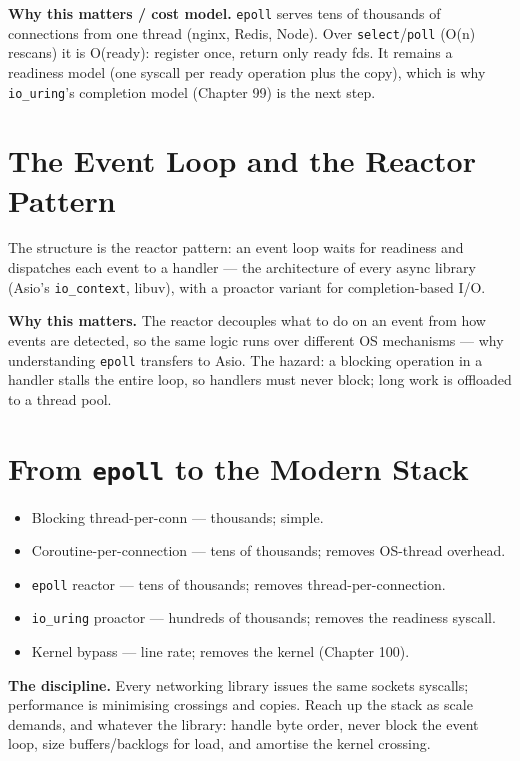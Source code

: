 \textbf{Why this matters / cost model.} \texttt{epoll} serves tens of thousands of connections from one thread (nginx, Redis, Node). Over \texttt{select}/\texttt{poll} (O(n) rescans) it is O(ready): register once, return only ready fds. It remains a readiness model (one syscall per ready operation plus the copy), which is why \texttt{io\_uring}'s completion model (Chapter 99) is the next step.

\section{The Event Loop and the Reactor Pattern}
The structure is the reactor pattern: an event loop waits for readiness and dispatches each event to a handler --- the architecture of every async library (Asio's \texttt{io\_context}, libuv), with a proactor variant for completion-based I/O.

\textbf{Why this matters.} The reactor decouples what to do on an event from how events are detected, so the same logic runs over different OS mechanisms --- why understanding \texttt{epoll} transfers to Asio. The hazard: a blocking operation in a handler stalls the entire loop, so handlers must never block; long work is offloaded to a thread pool.

\section{From \texttt{epoll} to the Modern Stack}
\begin{itemize}
\item Blocking thread-per-conn --- thousands; simple.
\item Coroutine-per-connection --- tens of thousands; removes OS-thread overhead.
\item \texttt{epoll} reactor --- tens of thousands; removes thread-per-connection.
\item \texttt{io\_uring} proactor --- hundreds of thousands; removes the readiness syscall.
\item Kernel bypass --- line rate; removes the kernel (Chapter 100).
\end{itemize}

\textbf{The discipline.} Every networking library issues the same sockets syscalls; performance is minimising crossings and copies. Reach up the stack as scale demands, and whatever the library: handle byte order, never block the event loop, size buffers/backlogs for load, and amortise the kernel crossing.
